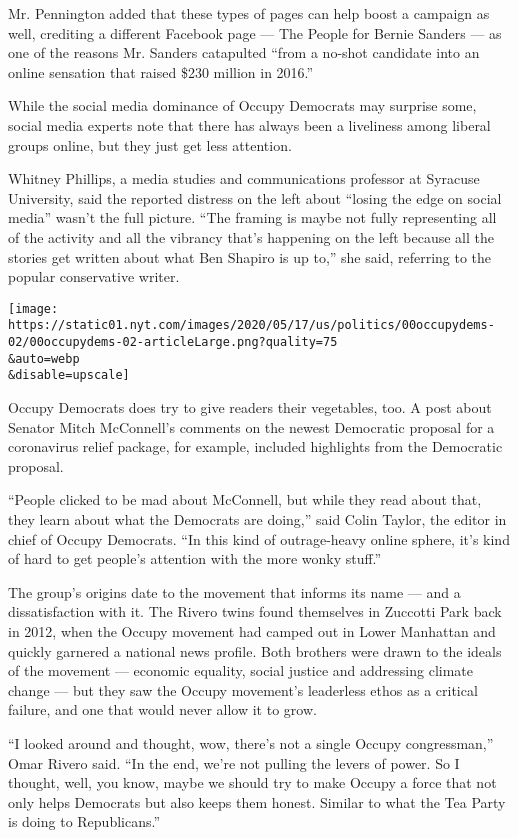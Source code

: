 Mr. Pennington added that these types of pages can help boost a campaign
as well, crediting a different Facebook page --- The People for Bernie
Sanders --- as one of the reasons Mr. Sanders catapulted ``from a
no-shot candidate into an online sensation that raised \$230 million in
2016.''

While the social media dominance of Occupy Democrats may surprise some,
social media experts note that there has always been a liveliness among
liberal groups online, but they just get less attention.

Whitney Phillips, a media studies and communications professor at
Syracuse University, said the reported distress on the left about
``losing the edge on social media'' wasn't the full picture. ``The
framing is maybe not fully representing all of the activity and all the
vibrancy that's happening on the left because all the stories get
written about what Ben Shapiro is up to,'' she said, referring to the
popular conservative writer.

\texttt{[image: https://static01.nyt.com/images/2020/05/17/us/politics/00occupydems-02/00occupydems-02-articleLarge.png?quality=75\\\&auto=webp\\\&disable=upscale]}

Occupy Democrats does try to give readers their vegetables, too. A post
about Senator Mitch McConnell's comments on the newest Democratic
proposal for a coronavirus relief package, for example, included
highlights from the Democratic proposal.

``People clicked to be mad about McConnell, but while they read about
that, they learn about what the Democrats are doing,'' said Colin
Taylor, the editor in chief of Occupy Democrats. ``In this kind of
outrage-heavy online sphere, it's kind of hard to get people's attention
with the more wonky stuff.''

The group's origins date to the movement that informs its name --- and a
dissatisfaction with it. The Rivero twins found themselves in Zuccotti
Park back in 2012, when the Occupy movement had camped out in Lower
Manhattan and quickly garnered a national news profile. Both brothers
were drawn to the ideals of the movement --- economic equality, social
justice and addressing climate change --- but they saw the Occupy
movement's leaderless ethos as a critical failure, and one that would
never allow it to grow.

``I looked around and thought, wow, there's not a single Occupy
congressman,'' Omar Rivero said. ``In the end, we're not pulling the
levers of power. So I thought, well, you know, maybe we should try to
make Occupy a force that not only helps Democrats but also keeps them
honest. Similar to what the Tea Party is doing to Republicans.''


